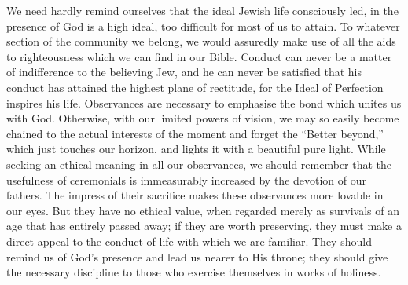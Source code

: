 We need hardly remind ourselves that
the ideal Jewish life consciously led, in the
presence of God is a high ideal, too difficult
for most of us to attain. To whatever
section of the community we belong, we
would assuredly make use of all the aids
to righteousness which we can find in our
Bible. Conduct can never be a matter of
indifference to the believing Jew, and he
can never be satisfied that his conduct has
attained the highest plane of rectitude, for
the Ideal of Perfection inspires his life.
Observances are necessary to emphasise
the bond which unites us with God. Otherwise,
with our limited powers of vision,
we may so easily become chained to the
actual interests of the moment and forget
the “Better beyond,” which just touches
our horizon, and lights it with a beautiful pure
light. While seeking an ethical meaning
in all our observances, we should remember
that the usefulness of ceremonials is immeasurably
increased by the devotion of
our fathers. The impress of their sacrifice
makes these observances more lovable in
our eyes. But they have no ethical value,
when regarded merely as survivals of an
age that has entirely passed away; if they
are worth preserving, they must make a
direct appeal to the conduct of life with
which we are familiar. They should remind
us of God’s presence and lead us nearer
to His throne; they should give the
necessary discipline to those who exercise
themselves in works of holiness.

